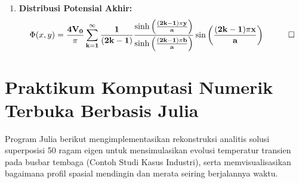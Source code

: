 \documentclass[11pt,a4paper]{article}
\theoremstyle{definition}
\begin{document}
\begin{enumerate}[leftmargin=*]
    \item \textbf{Distribusi Potensial Akhir:}
    \begin{equation*}
        \Phi(x, y) = \mathbf{\frac{4V_0}{\pi} \sum_{k=1}^{\infty} \frac{1}{(2k-1)} \frac{\sinh\left(\frac{(2k-1)\pi y}{a}\right)}{\sinh\left(\frac{(2k-1)\pi b}{a}\right)} \sin\left(\frac{(2k-1)\pi x}{a}\right)} \quad \qed
    \end{equation*}
\end{enumerate}

\section{Praktikum Komputasi Numerik Terbuka Berbasis Julia}

Program Julia berikut mengimplementasikan rekonstruksi analitis solusi superposisi 50 ragam eigen untuk mensimulasikan evolusi temperatur transien pada busbar tembaga (Contoh Studi Kasus Industri), serta memvisualisasikan bagaimana profil spasial mendingin dan merata seiring berjalannya waktu.
\end{document}

